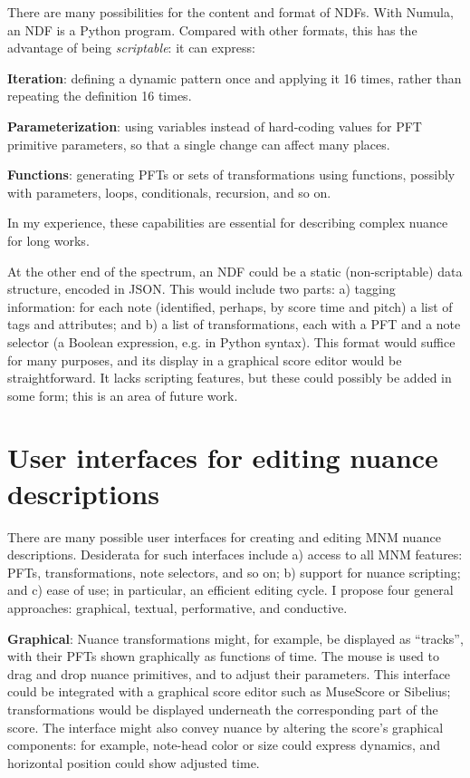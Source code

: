 \documentclass[letterpaper, 12pt]{article}
\begin{document}
There are many possibilities for the content and format of NDFs.
With Numula, an NDF is a Python program.
Compared with other formats,
this has the advantage of being \textit{scriptable}: it can express:

\textbf{Iteration}:
defining a dynamic pattern once and applying it 16 times,
rather than repeating the definition 16 times.

\textbf{Parameterization}:
using variables instead of hard-coding values for PFT primitive parameters,
so that a single change can affect many places.

\textbf{Functions}:
generating PFTs or sets of transformations using functions,
possibly with parameters, loops, conditionals, recursion, and so on.

In my experience, these capabilities are essential for
describing complex nuance for long works.

At the other end of the spectrum,
an NDF could be a static (non-scriptable) data structure, encoded in JSON.
This would include two parts:
a) tagging information:
for each note (identified, perhaps, by score time and pitch)
a list of tags and attributes;
and b) a list of transformations, each with a PFT and a note selector
(a Boolean expression, e.g. in Python syntax).
This format would suffice for many purposes,
and its display in a graphical score editor would be straightforward.
It lacks scripting features,
but these could possibly be added in some form;
this is an area of future work.

\section{User interfaces for editing nuance descriptions}

There are many possible user interfaces for creating
and editing MNM nuance descriptions.
Desiderata for such interfaces include
a) access to all MNM features:
PFTs, transformations, note selectors, and so on;
b) support for nuance scripting;
and c) ease of use; in particular, an efficient editing cycle.
I propose four general approaches:
graphical, textual, performative, and conductive.

\textbf{Graphical}:
Nuance transformations might, for example,
be displayed as ``tracks'',
with their PFTs shown graphically as functions of time.
The mouse is used to drag and drop nuance primitives,
and to adjust their parameters.
This interface could be integrated with a graphical score editor
such as MuseScore or Sibelius;
transformations would be displayed underneath the
corresponding part of the score.
The interface might also convey nuance by altering
the score's graphical components:
for example, note-head color or size could express dynamics,
and horizontal position could show adjusted time.
\end{document}
